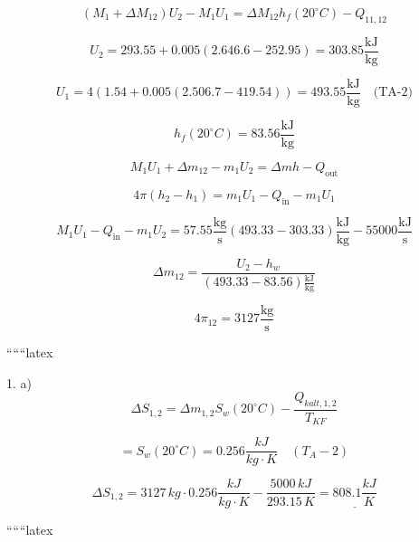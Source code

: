 \[
(M_1 + \Delta M_{12}) U_2 - M_1 U_1 = \Delta M_{12} h_f (20^\circ C) - Q_{11,12}
\]

\[
U_2 = 293.55 + 0.005 (2.646.6 - 252.95) = 303.85 \frac{\text{kJ}}{\text{kg}}
\]

\[
U_1 = 4 (1.54 + 0.005 (2.506.7 - 419.54)) = 493.55 \frac{\text{kJ}}{\text{kg}} \quad \text{(TA-2)}
\]

\[
h_f (20^\circ C) = 83.56 \frac{\text{kJ}}{\text{kg}}
\]

\[
M_1 U_1 + \Delta m_{12} - m_1 U_2 = \Delta m h - Q_{\text{out}}
\]

\[
4 \pi (h_2 - h_1) = m_1 U_1 - Q_{\text{in}} - m_1 U_1
\]

\[
M_1 U_1 - Q_{\text{in}} - m_1 U_2 = 57.55 \frac{\text{kg}}{\text{s}} (493.33 - 303.33) \frac{\text{kJ}}{\text{kg}} - 55000 \frac{\text{kJ}}{\text{s}}
\]

\[
\Delta m_{12} = \frac{U_2 - h_w}{(493.33 - 83.56) \frac{\text{kJ}}{\text{kg}}}
\]

\[
4 \pi_{12} = 3127 \frac{\text{kg}}{\text{s}}
\]

``````latex


1. a) 
\[
\Delta S_{1,2} = \Delta m_{1,2} S_w (20^\circ C) - \frac{Q_{kalt,1,2}}{T_{KF}}
\]

\[
= S_w (20^\circ C) = 0.256 \frac{kJ}{kg \cdot K} \quad (T_A - 2)
\]

\[
\Delta S_{1,2} = 3127 \, kg \cdot 0.256 \frac{kJ}{kg \cdot K} - \frac{5000 \, kJ}{293.15 \, K} = \underline{808.1 \frac{kJ}{K}}
\]

``````latex


